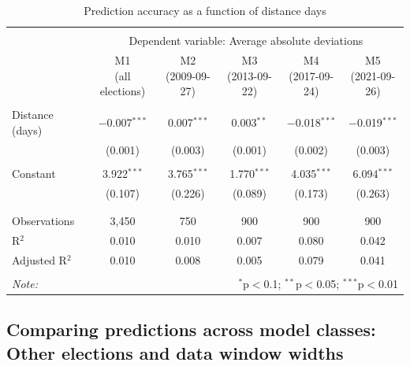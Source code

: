 \documentclass[
  letterpaper,
  DIV=11,
  numbers=noendperiod]{scrartcl}
\begin{document}
\hypertarget{tbl-A2}{}
\begin{table}[!htbp] \centering 
  \caption{\label{tbl-A2}Prediction accuracy as a function of distance days } 
  \label{} 
\scriptsize 
\begin{tabular}{@{\extracolsep{5pt}}lccccc} 
\\[-1.8ex]\hline 
\hline \\[-1.8ex] 
 & \multicolumn{5}{c}{Dependent variable: Average absolute deviations} \\ 
\cline{2-6} 
 & \shortstack{M1 \\ (all elections)} & \shortstack{M2 \\ (2009-09-27)} & \shortstack{M3 \\ (2013-09-22)} & \shortstack{M4 \\ (2017-09-24)} & \shortstack{M5 \\ (2021-09-26)} \\ 
\hline \\[-1.8ex] 
 Distance (days) & $-$0.007$^{***}$ & 0.007$^{***}$ & 0.003$^{**}$ & $-$0.018$^{***}$ & $-$0.019$^{***}$ \\ 
  & (0.001) & (0.003) & (0.001) & (0.002) & (0.003) \\ 
  & & & & & \\ 
 Constant & 3.922$^{***}$ & 3.765$^{***}$ & 1.770$^{***}$ & 4.035$^{***}$ & 6.094$^{***}$ \\ 
  & (0.107) & (0.226) & (0.089) & (0.173) & (0.263) \\ 
  & & & & & \\ 
\hline \\[-1.8ex] 
Observations & 3,450 & 750 & 900 & 900 & 900 \\ 
R$^{2}$ & 0.010 & 0.010 & 0.007 & 0.080 & 0.042 \\ 
Adjusted R$^{2}$ & 0.010 & 0.008 & 0.005 & 0.079 & 0.041 \\ 
\hline 
\hline \\[-1.8ex] 
\textit{Note:}  & \multicolumn{5}{r}{$^{*}$p$<$0.1; $^{**}$p$<$0.05; $^{***}$p$<$0.01} \\ 
\end{tabular} 
\end{table}

\hypertarget{sec-comparing-model-classes-other}{%
\subsection{Comparing predictions across model classes: Other elections
and data window widths}\label{sec-comparing-model-classes-other}}
\end{document}
